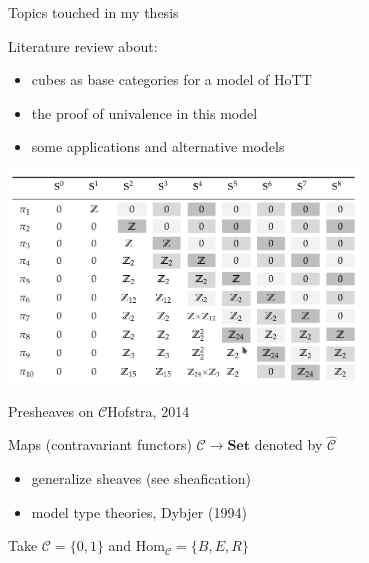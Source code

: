 \documentclass[english,draft]{beamer}
\begin{document}
\begin{frame}{Topics touched in my thesis}

Literature review about:
\begin{itemize}
\item cubes as base categories for a model of HoTT
\item the proof of univalence in this model
\item some applications and alternative models
\end{itemize}

\centering
\includegraphics[width=0.7\textwidth]{figures/groups}


\end{frame}

\begin{frame}{Presheaves on $\mathcal{C}$}{Hofstra, 2014}
 
 Maps (contravariant functors) $\mathcal{C} \rightarrow \mathbf{Set}$ denoted by $\hat{\mathcal{C}}$
 
 \begin{itemize}
 \item generalize sheaves (see sheafication)
 \item model type theories, Dybjer (1994)
 \end{itemize}
 
 \begin{example}    
 Take $\mathcal{C} = \{0,1\}$ and $\text{Hom}_{\mathcal{C}}= \{B,E,R\}$
 
     
 
 
 
\end{example} 

 
\end{frame}
\end{document}

